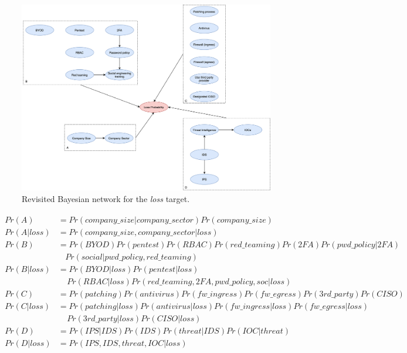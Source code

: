\begin{figure}[h!]
	\center
	\includegraphics[scale=0.60]{images/synthetic/bayesian_hard.png}
	\caption{\label{fig:bayesian-hard} Revisited Bayesian network for the \textit{loss} target.}
\end{figure}

\begin{equation} \label{eq2}
\begin{aligned}
\begin{split}
Pr(A) & = Pr(company\_size | company\_sector)Pr(company\_size) \\
Pr(A|loss) & = Pr(company\_size, company\_sector | loss) \\
Pr(B) & = {Pr(BYOD)Pr(pentest)Pr(RBAC)Pr(red\_teaming)Pr(2FA)Pr(pwd\_policy | 2FA)}\\ 
& \ \ \ \ Pr(social|pwd\_policy,red\_teaming) \\
Pr(B|loss) & = Pr(BYOD|loss)Pr(pentest|loss)\\
& \ \ \ \ \ Pr(RBAC|loss)Pr(red\_teaming, 2FA, pwd\_policy,soc|loss) \\
Pr(C) & = Pr(patching)Pr(antivirus)Pr(fw\_ingress)Pr(fw\_egress)Pr(3rd\_party)Pr(CISO)\\
Pr(C|loss) & = Pr(patching|loss)Pr(antivirus|loss)Pr(fw\_ingress|loss)Pr(fw\_egress|loss) \\
& \ \ \ \ \ Pr(3rd\_party|loss)Pr(CISO|loss) \\
Pr(D) & = Pr(IPS|IDS)Pr(IDS)Pr(threat|IDS)Pr(IOC|threat) \\
Pr(D|loss) & = Pr(IPS, IDS, threat, IOC|loss)
\end{split}
\end{aligned}
\end{equation}

